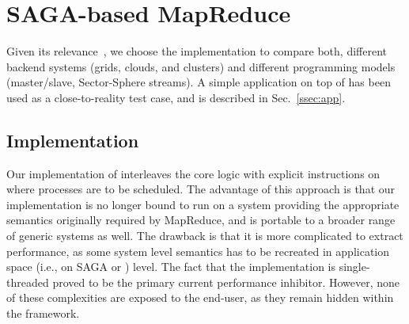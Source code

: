 \documentclass[graybox]{svmult}
\begin{document}
\section{SAGA-based MapReduce}
\label{sec:mr}

 Given its relevance~\cite{saga_ccgrid09}, we choose the \smr
 implementation to compare both, different backend systems (grids,
 clouds, and clusters) and different programming models (master/slave,
 Sector-Sphere streams).  A simple \wc application on top of
 \smr has been used as a close-to-reality test case, and is
 described in Sec.~\ref{ssec:app}.


\subsection{\sagamapreduce Implementation}


Our implementation of \sagamapreduce interleaves the core \mr logic
with explicit instructions on where processes are to be scheduled.
The advantage of this approach is that our implementation is no longer
bound to run on a system providing the appropriate semantics
originally required by MapReduce, and is portable to a broader range
of generic systems as well.  The drawback is that it is more
complicated to extract performance, as some system level semantics has
to be recreated in application space (i.e., on SAGA or \smr) level.
The fact that the implementation is single-threaded proved to be the
primary current performance inhibitor.  However, none of these
complexities are exposed to the end-user, as they remain hidden within
the framework. 

\end{document}
